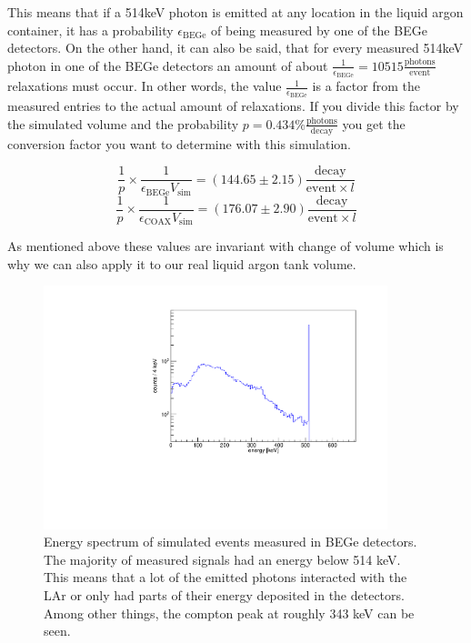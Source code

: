 \documentclass[encoding=utf8,british]{tumphthesis}
\begin{document}
This means that if a 514keV photon is emitted at any location in the liquid argon container, it has a probability \(\epsilon_{\mathrm{BEGe}}\) of being measured by one of the BEGe detectors.
On the other hand, it can also be said, that for every measured 514keV photon in one of the BEGe detectors an amount of about $\frac{1}{\epsilon_{\mathrm{BEGe}}} = 10515 \frac{\mathrm{photons}}{\mathrm{event}}$  relaxations must occur.
In other words, the value $\frac{1}{\epsilon_{\mathrm{BEGe}}}$ is a factor from the measured entries to the actual amount of  relaxations.
If you divide this factor by the simulated volume and the probability $p=0.434\% \frac{\mathrm{photons}}{\mathrm{decay}}$ you get the conversion factor you want to determine with this simulation.

\begin{equation*}
\frac{1}{p}\times\frac{1}{\epsilon_{\mathrm{BEGe}} V_{\mathrm{sim}}} = (144.65\pm2.15) \frac{\mathrm{decay}}{\mathrm{event} \times l}
\end{equation*}
\begin{equation*}
\frac{1}{p}\times\frac{1}{\epsilon_{\mathrm{COAX}} V_{\mathrm{sim}}} = (176.07\pm2.90) \frac{\mathrm{decay}}{\mathrm{event} \times l}
\end{equation*}

As mentioned above these values are invariant with change of volume which is why we can also apply it to our real liquid argon tank volume. 
\\

\begin{figure}[t!]
	\centering
	\ifmakefigures%
	\includegraphics[width=100mm]{./Bilder/MC-514-Phasenraum.pdf}
	\fi%
	\caption{
    Energy spectrum of simulated events measured in BEGe detectors.
	The majority of measured signals had an energy below 514 keV.
	This means that a lot of the emitted photons interacted with the LAr or only had parts of their energy deposited in the detectors.
	Among other things, the compton peak at roughly 343 keV can be seen.  
	}
	\label{fig:PhasenraumMC514}
\end{figure}
\end{document}
